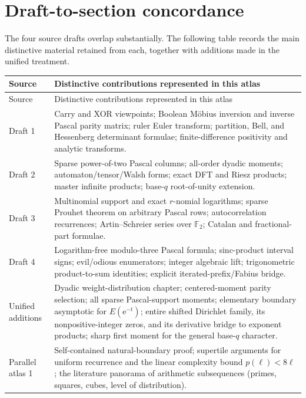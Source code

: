 \documentclass[11pt,oneside]{article}
\numberwithin{equation}{section}
\theoremstyle{definition}
\theoremstyle{remark}
\newcommand{\e}{\mathrm e}
\begin{document}
\section[Draft concordance]{Draft-to-section concordance}
\label{app:draft-concordance}

The four source drafts overlap substantially.  The following table records
the main distinctive material retained from each, together with additions made
in the unified treatment.

\renewcommand{\arraystretch}{1.16}
\begin{longtable}{@{}p{}p{}@{}}
\toprule
Source & Distinctive contributions represented in this atlas \\
\midrule
\endfirsthead
\toprule
Source & Distinctive contributions represented in this atlas \\
\midrule
\endhead
Draft 1 & Carry and XOR viewpoints; Boolean M\"obius inversion and inverse Pascal parity matrix; ruler Euler transform; partition, Bell, and Hessenberg determinant formulae; finite-difference positivity and analytic transforms. \\
Draft 2 & Sparse power-of-two Pascal columns; all-order dyadic moments; automaton/tensor/Walsh forms; exact DFT and Riesz products; master infinite products; base-\(q\) root-of-unity extension. \\
Draft 3 & Multinomial support and exact \(r\)-nomial logarithms; sparse Prouhet theorem on arbitrary Pascal rows; autocorrelation recurrences; Artin--Schreier series over \(\mathbb F_2\); Catalan and fractional-part formulae. \\
Draft 4 & Logarithm-free modulo-three Pascal formula; sinc-product interval signs; evil/odious enumerators; integer algebraic lift; trigonometric product-to-sum identities; explicit iterated-prefix/Fabius bridge. \\
Unified additions & Dyadic weight-distribution chapter; centered-moment parity selection; all sparse Pascal-support moments; elementary boundary asymptotic for \(E(\e^{-t})\); entire shifted Dirichlet family, its nonpositive-integer zeros, and its derivative bridge to exponent products; sharp first moment for the general base-\(q\) character. \\
\midrule
Parallel atlas 1 & Self-contained natural-boundary proof; supertile arguments for uniform recurrence and the linear complexity bound \(p(\ell)<8\ell\); the literature panorama of arithmetic subsequences (primes, squares, cubes, level of distribution). \\

\end{longtable}
\end{document}
